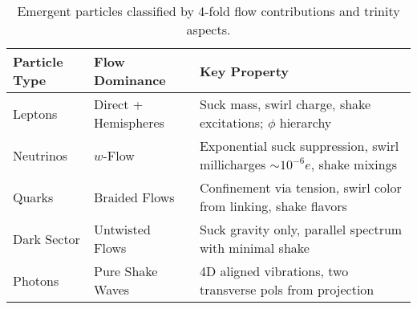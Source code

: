 \begin{table}[h]
\centering
\begin{tabular}{|l|l|l|}
\hline
Particle Type & Flow Dominance & Key Property \\
\hline
Leptons & Direct + Hemispheres & Suck mass, swirl charge, shake excitations; $\phi$ hierarchy \\
Neutrinos & $w$-Flow & Exponential suck suppression, swirl millicharges $\sim 10^{-6} e$, shake mixings \\
Quarks & Braided Flows & Confinement via tension, swirl color from linking, shake flavors \\
Dark Sector & Untwisted Flows & Suck gravity only, parallel spectrum with minimal shake \\
Photons & Pure Shake Waves & 4D aligned vibrations, two transverse pols from projection \\
\hline
\end{tabular}
\caption{Emergent particles classified by 4-fold flow contributions and trinity aspects.}
\label{tab:particles}
\end{table}

\medskip
\noindent
{}
\medskip
